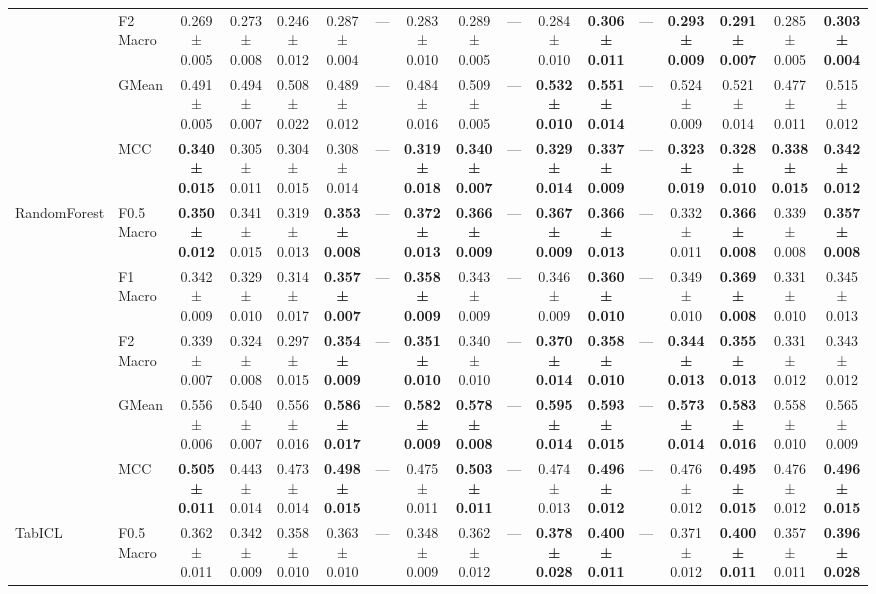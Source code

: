 \begin{table}[H]
{\begin{tabular}{llccccccccccccccc}
 & F2 Macro & 0.269 ± 0.005 & 0.273 ± 0.008 & 0.246 ± 0.012 & 0.287 ± 0.004 & — & 0.283 ± 0.010 & 0.289 ± 0.005 & — & 0.284 ± 0.010 & \textbf{0.306 ± 0.011} & — & \textbf{0.293 ± 0.009} & \textbf{0.291 ± 0.007} & 0.285 ± 0.005 & \textbf{0.303 ± 0.004} \\
 & GMean & 0.491 ± 0.005 & 0.494 ± 0.007 & 0.508 ± 0.022 & 0.489 ± 0.012 & — & 0.484 ± 0.016 & 0.509 ± 0.005 & — & \textbf{0.532 ± 0.010} & \textbf{0.551 ± 0.014} & — & 0.524 ± 0.009 & 0.521 ± 0.014 & 0.477 ± 0.011 & 0.515 ± 0.012 \\
 & MCC & \textbf{0.340 ± 0.015} & 0.305 ± 0.011 & 0.304 ± 0.015 & 0.308 ± 0.014 & — & \textbf{0.319 ± 0.018} & \textbf{0.340 ± 0.007} & — & \textbf{0.329 ± 0.014} & \textbf{0.337 ± 0.009} & — & \textbf{0.323 ± 0.019} & \textbf{0.328 ± 0.010} & \textbf{0.338 ± 0.015} & \textbf{0.342 ± 0.012} \\
\cline{1-17}
\multirow[t]{5}{*}{RandomForest} & F0.5 Macro & \textbf{0.350 ± 0.012} & 0.341 ± 0.015 & 0.319 ± 0.013 & \textbf{0.353 ± 0.008} & — & \textbf{0.372 ± 0.013} & \textbf{0.366 ± 0.009} & — & \textbf{0.367 ± 0.009} & \textbf{0.366 ± 0.013} & — & 0.332 ± 0.011 & \textbf{0.366 ± 0.008} & 0.339 ± 0.008 & \textbf{0.357 ± 0.008} \\
 & F1 Macro & 0.342 ± 0.009 & 0.329 ± 0.010 & 0.314 ± 0.017 & \textbf{0.357 ± 0.007} & — & \textbf{0.358 ± 0.009} & 0.343 ± 0.009 & — & 0.346 ± 0.009 & \textbf{0.360 ± 0.010} & — & 0.349 ± 0.010 & \textbf{0.369 ± 0.008} & 0.331 ± 0.010 & 0.345 ± 0.013 \\
 & F2 Macro & 0.339 ± 0.007 & 0.324 ± 0.008 & 0.297 ± 0.015 & \textbf{0.354 ± 0.009} & — & \textbf{0.351 ± 0.010} & 0.340 ± 0.010 & — & \textbf{0.370 ± 0.014} & \textbf{0.358 ± 0.010} & — & \textbf{0.344 ± 0.013} & \textbf{0.355 ± 0.013} & 0.331 ± 0.012 & 0.343 ± 0.012 \\
 & GMean & 0.556 ± 0.006 & 0.540 ± 0.007 & 0.556 ± 0.016 & \textbf{0.586 ± 0.017} & — & \textbf{0.582 ± 0.009} & \textbf{0.578 ± 0.008} & — & \textbf{0.595 ± 0.014} & \textbf{0.593 ± 0.015} & — & \textbf{0.573 ± 0.014} & \textbf{0.583 ± 0.016} & 0.558 ± 0.010 & 0.565 ± 0.009 \\
 & MCC & \textbf{0.505 ± 0.011} & 0.443 ± 0.014 & 0.473 ± 0.014 & \textbf{0.498 ± 0.015} & — & 0.475 ± 0.011 & \textbf{0.503 ± 0.011} & — & 0.474 ± 0.013 & \textbf{0.496 ± 0.012} & — & 0.476 ± 0.012 & \textbf{0.495 ± 0.015} & 0.476 ± 0.012 & \textbf{0.496 ± 0.015} \\
\cline{1-17}
\multirow[t]{5}{*}{TabICL} & F0.5 Macro & 0.362 ± 0.011 & 0.342 ± 0.009 & 0.358 ± 0.010 & 0.363 ± 0.010 & — & 0.348 ± 0.009 & 0.362 ± 0.012 & — & \textbf{0.378 ± 0.028} & \textbf{0.400 ± 0.011} & — & 0.371 ± 0.012 & \textbf{0.400 ± 0.011} & 0.357 ± 0.011 & \textbf{0.396 ± 0.028} \\

\end{tabular}}
\end{table}
